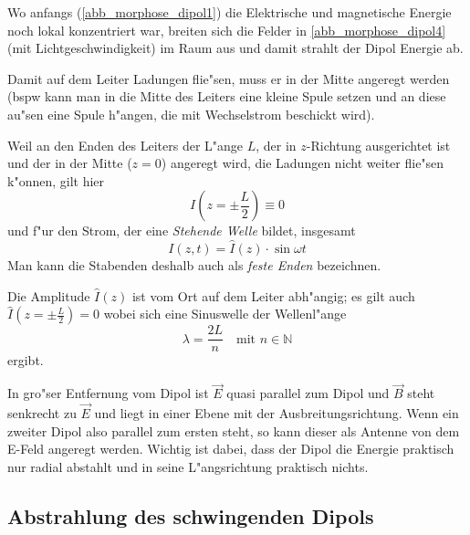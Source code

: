 Wo anfangs (\ref{abb_morphose_dipol1}) die Elektrische und
magnetische Energie noch lokal konzentriert war, breiten sich die
Felder in \ref{abb_morphose_dipol4} (mit Lichtgeschwindigkeit) im Raum
aus und damit strahlt der Dipol Energie ab.

Damit auf dem Leiter Ladungen flie"sen, muss er in der Mitte angeregt
werden (bspw kann man in die Mitte des Leiters eine kleine Spule
setzen und an diese au"sen eine Spule h"angen, die mit Wechselstrom
beschickt wird).

Weil an den Enden des Leiters der L"ange $L$, der in $z$-Richtung
ausgerichtet ist und der in der Mitte ($z = 0$) angeregt
wird, die Ladungen nicht weiter flie"sen k"onnen, gilt hier
\begin{equation*}
   I(z = \pm\frac{L}{2}) \equiv 0
\end{equation*}
und f"ur den Strom, der eine \emph{Stehende
  Welle} bildet, insgesamt
\begin{equation*}
   I(z,t) = \hat I(z) \cdot \sin \omega t
\end{equation*}
Man kann die Stabenden deshalb auch als \emph{feste Enden}
bezeichnen.

Die Amplitude $\hat I (z)$ ist vom Ort auf dem Leiter abh"angig; es
gilt auch   $\hat I(z = \pm\frac{L}{2}) = 0$ wobei sich eine
Sinuswelle der Wellenl"ange
\begin{equation*}
   \lambda = \frac{2L}{n} \text{ ~ mit } n \in \mathbb N
\end{equation*}
ergibt.

In gro"ser Entfernung vom Dipol ist $\vec E$ quasi parallel zum Dipol
und $\vec B$ steht senkrecht zu $\vec E$ und liegt in einer Ebene mit
der Ausbreitungsrichtung. Wenn ein zweiter Dipol also parallel zum
ersten steht, so kann dieser als Antenne von dem E-Feld angeregt
werden. Wichtig ist dabei, dass der Dipol die Energie praktisch nur
radial abstahlt und in seine L"angsrichtung praktisch nichts.



\subsection{Abstrahlung des schwingenden Dipols}
\label{kap_abstrahlung-des-schwingenden-dipols}

